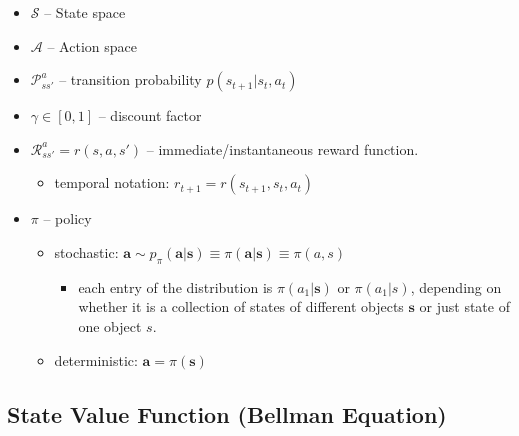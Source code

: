 \documentclass[twocolumn,landscape,10pt]{article}
\theoremstyle{definition}
\begin{document}
\begin{itemize}
    \item $\mathcal{S}$ -- State space
    \item $\mathcal{A}$ -- Action space
    \item $\mathcal{P}_{ss'}^{a}$ -- transition probability $p(s_{t+1}|s_t,a_t)$
    \item $\gamma\in[0,1]$ -- discount factor
    \item $\mathcal{R}_{ss'}^{a}=r(s,a,s')$ -- immediate/instantaneous reward
        function.
        \begin{itemize}
            \item temporal notation: $r_{t+1}=r(s_{t+1},s_t,a_t)$
        \end{itemize}
    \item $\pi$ -- policy
        \begin{itemize}
            \item stochastic: $\mathbf{a}\sim p_\pi(\mathbf{a}|\mathbf{s})
                \equiv \pi(\mathbf{a}|\mathbf{s}) \equiv \pi(a,s)$
                \begin{itemize}
                    \item each entry of the distribution is $\pi(a_1|\mathbf{s})$
                        or $\pi(a_1|s)$, depending on whether it is a collection
                        of states of different objects $\mathbf{s}$ or just
                        state of one object $s$.
                \end{itemize}
            \item deterministic: $\mathbf{a}=\pi(\mathbf{s})$
        \end{itemize}
\end{itemize}

\subsection{State Value Function (Bellman Equation)}
\end{document}
